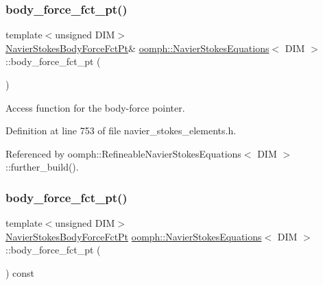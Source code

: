 \subsubsection{\texorpdfstring{body\+\_\+force\+\_\+fct\+\_\+pt()}{body\_force\_fct\_pt()}\hspace{0.1cm}{\footnotesize\ttfamily [1/2]}}
{\footnotesize\ttfamily template$<$unsigned D\+IM$>$ \\
\hyperlink{classoomph_1_1NavierStokesEquations_a01443cdc37d9aa9d7644c79212108842}{Navier\+Stokes\+Body\+Force\+Fct\+Pt}\& \hyperlink{classoomph_1_1NavierStokesEquations}{oomph\+::\+Navier\+Stokes\+Equations}$<$ D\+IM $>$\+::body\+\_\+force\+\_\+fct\+\_\+pt (\begin{DoxyParamCaption}{ }\end{DoxyParamCaption})\hspace{0.3cm}{\ttfamily [inline]}}



Access function for the body-\/force pointer. 



Definition at line 753 of file navier\+\_\+stokes\+\_\+elements.\+h.



Referenced by oomph\+::\+Refineable\+Navier\+Stokes\+Equations$<$ D\+I\+M $>$\+::further\+\_\+build().

\mbox{\label{classoomph_1_1NavierStokesEquations_a2a3badc58671a1c914ebc71df300c471}} 
\subsubsection{\texorpdfstring{body\+\_\+force\+\_\+fct\+\_\+pt()}{body\_force\_fct\_pt()}\hspace{0.1cm}{\footnotesize\ttfamily [2/2]}}
{\footnotesize\ttfamily template$<$unsigned D\+IM$>$ \\
\hyperlink{classoomph_1_1NavierStokesEquations_a01443cdc37d9aa9d7644c79212108842}{Navier\+Stokes\+Body\+Force\+Fct\+Pt} \hyperlink{classoomph_1_1NavierStokesEquations}{oomph\+::\+Navier\+Stokes\+Equations}$<$ D\+IM $>$\+::body\+\_\+force\+\_\+fct\+\_\+pt (\begin{DoxyParamCaption}{ }\end{DoxyParamCaption}) const\hspace{0.3cm}{\ttfamily [inline]}}




